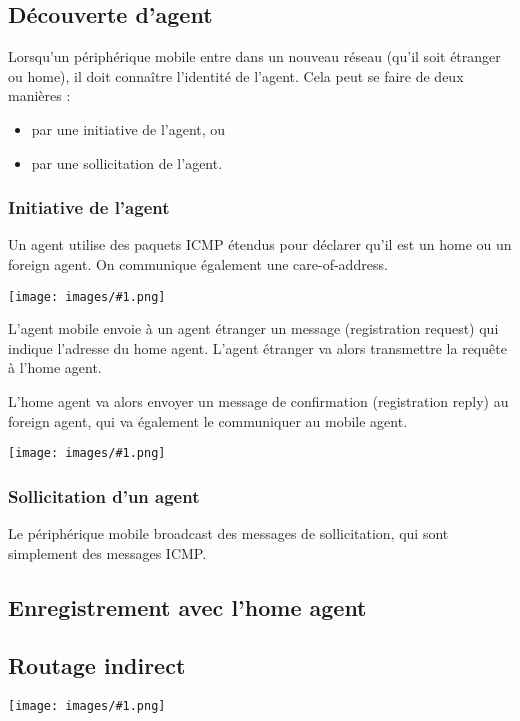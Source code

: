 \documentclass[10pt,a4paper]{report}
\newcommand{\dessin}[1]{\begin{center}\texttt{[image: images/\#1.png]}\end{center}}
\begin{document}
		\subsection{Découverte d'agent}
	
		Lorsqu'un périphérique mobile entre dans un nouveau réseau (qu'il soit étranger ou home), il doit connaître l'identité de l'agent. Cela peut se faire de deux manières :
		
		\begin{itemize}
			\item par une initiative de l'agent, ou
			\item par une sollicitation de l'agent.
		\end{itemize}
  	
  			\subsubsection{Initiative de l'agent}
			Un agent utilise des paquets ICMP étendus pour déclarer qu'il est un home ou un foreign agent. On communique également une care-of-address.
  	
			\dessin{57}
  	
			L'agent mobile envoie à un agent étranger un message (registration request) qui indique l'adresse du home agent. L'agent étranger va alors transmettre la requête à l'home agent.
  	
			L'home agent va alors envoyer un message de confirmation (registration reply) au foreign agent, qui va également le communiquer au mobile agent.
		
			\dessin{58} 
		
			\subsubsection{Sollicitation d'un agent}
			
			Le périphérique mobile broadcast des messages de sollicitation, qui sont simplement des messages ICMP. 	
		
		\subsection{Enregistrement avec l'home agent}
		
		\subsection{Routage indirect}
		\dessin{56}
  
		
  	
\end{document}

